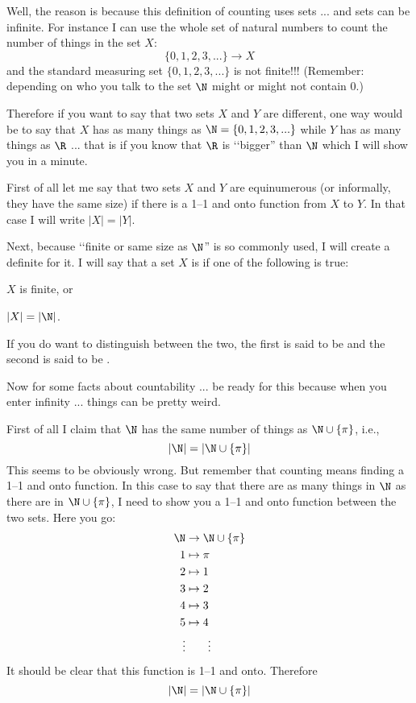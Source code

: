 Well, the reason is because this definition of counting
uses sets ... and sets can be infinite.
For instance
I can use the whole set of natural numbers to count
the number of things in the set $X$:
\[
\{0, 1, 2, 3, ...\} \rightarrow X
\] 
and the standard measuring set $\{0, 1, 2, 3, ...\}$ is not finite!!!
(Remember: depending on who you talk to the set $\N$ might or might not
contain 0.)

Therefore if you want to say that two sets $X$ and $Y$ are different,
one way would be to say that $X$ has as many things as 
$\N = \{0, 1, 2, 3, ...\}$
while $Y$ has as many things as $\R$ ... that is if you know that 
$\R$ is \lq\lq bigger'' than $\N$ which I will show you in a minute.

First of all let me say that two sets $X$ and $Y$ are equinumerous
(or informally, they have the same size) if there is a 1--1 and onto function
from $X$ to $Y$.
In that case I will write $|X| = |Y|$.

Next, because \lq\lq finite or same size as $\N$'' is so commonly used,
I will create a definite for it.
I will say that a set $X$ is  if one of the following
is true:
\begin{tightlist}
\item $X$ is finite, or
\item $|X| = |\N|$.
\end{tightlist}
If you do want to distinguish between the two, the first is said to be 
 and the second is said to be 
.

Now for some facts about countability ... be ready for this because
when you enter infinity ... things can be pretty weird.

First of all I claim that $\N$ has the same number of things
as $\N \cup \{\pi\}$, i.e.,
\[
|\N| = |\N \cup \{\pi\}|
\]
This seems to be obviously wrong.
But remember that counting means finding a 1--1 and onto function.
In this case to say that there are as many things in $\N$ as there
are in $\N \cup \{\pi\}$, I need to show you a 1--1 and onto function
between the two sets.
Here you go:
\begin{align*}
\N &\rightarrow \N \cup \{\pi\} \\
1 &\mapsto \pi \\
2 &\mapsto 1 \\
3 &\mapsto 2 \\
4 &\mapsto 3 \\
5 &\mapsto 4 \\
\vdots &\hspace{0.7cm} \vdots
\end{align*}
It should be clear that this function is 1--1 and onto.
Therefore
\[
|\N| = |\N \cup \{\pi\}|
\]

